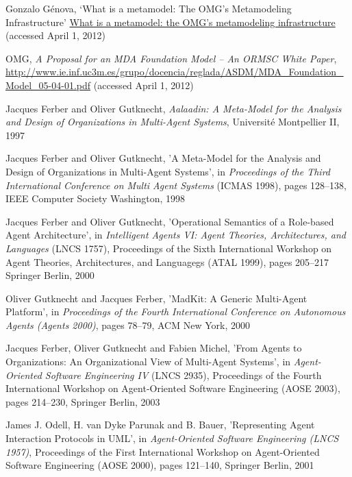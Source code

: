 \begin{thebibliography}{99}
Gonzalo Génova,
`What is a metamodel: The OMG’s Metamodeling Infrastructure'
\url{What is a metamodel: the OMG’s metamodeling infrastructure} (accessed April 1, 2012)

OMG,
\textit{A Proposal for an MDA Foundation Model -- An ORMSC White Paper},
\url{http://www.ie.inf.uc3m.es/grupo/docencia/reglada/ASDM/MDA_Foundation_Model_05-04-01.pdf} (accessed April 1, 2012)


Jacques Ferber and Oliver Gutknecht,
\textit{Aalaadin: A Meta-Model for the Analysis and Design of Organizations in Multi-Agent Systems},
Université Montpellier II, 1997

Jacques Ferber and Oliver Gutknecht,
'A Meta-Model for the Analysis and Design of Organizations in Multi-Agent Systems',
in \textit{Proceedings of the Third International Conference on Multi Agent Systems} (ICMAS 1998),
pages 128--138, 
IEEE Computer Society Washington, 1998

Jacques Ferber and Oliver Gutknecht,
'Operational Semantics of a Role-based Agent Architecture',
in \textit{Intelligent Agents VI: Agent Theories, Architectures, and Languages} (LNCS 1757),
Proceedings of the Sixth International Workshop on Agent Theories, Architectures, and Languagegs (ATAL 1999),
pages 205--217
Springer Berlin, 2000

Oliver Gutknecht and Jacques Ferber,
'MadKit: A Generic Multi-Agent Platform',
in \textit{Proceedings of the Fourth International Conference on Autonomous Agents (Agents 2000)},
pages 78--79,
ACM New York, 2000

Jacques Ferber, Oliver Gutknecht and Fabien Michel,
'From Agents to Organizations: An Organizational View of Multi-Agent Systems',
in \textit{Agent-Oriented Software Engineering IV} (LNCS 2935),
Proceedings of the Fourth International Workshop on Agent-Oriented Software Engineering (AOSE 2003),
pages 214--230,
Springer Berlin, 2003


James J. Odell, H. van Dyke Parunak and B. Bauer,
'Representing Agent Interaction Protocols in UML',
in \textit{Agent-Oriented Software Engineering (LNCS 1957)},
Proceedings of the First International Workshop on Agent-Oriented Software Engineering (AOSE 2000),
pages 121--140,
Springer Berlin, 2001


\end{thebibliography}
